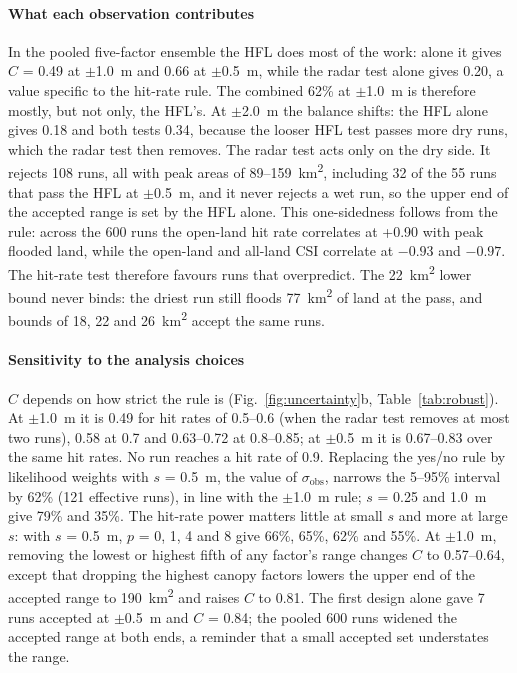 \documentclass[preprint,12pt,authoryear]{elsarticle}
\newcommand{\kmsq}{km\textsuperscript{2}}
\begin{document}
\paragraph{What each observation contributes} In the pooled five-factor ensemble the HFL does most of the work: alone it gives $C$ = 0.49 at $\pm$1.0~m and 0.66 at $\pm$0.5~m, while the radar test alone gives 0.20, a value specific to the hit-rate rule. The combined 62\% at $\pm$1.0~m is therefore mostly, but not only, the HFL's. At $\pm$2.0~m the balance shifts: the HFL alone gives 0.18 and both tests 0.34, because the looser HFL test passes more dry runs, which the radar test then removes. The radar test acts only on the dry side. It rejects 108 runs, all with peak areas of 89--159~\kmsq, including 32 of the 55 runs that pass the HFL at $\pm$0.5~m, and it never rejects a wet run, so the upper end of the accepted range is set by the HFL alone. This one-sidedness follows from the rule: across the 600 runs the open-land hit rate correlates at +0.90 with peak flooded land, while the open-land and all-land CSI correlate at $-0.93$ and $-0.97$. The hit-rate test therefore favours runs that overpredict. The 22~\kmsq{} lower bound never binds: the driest run still floods 77~\kmsq{} of land at the pass, and bounds of 18, 22 and 26~\kmsq{} accept the same runs.

\paragraph{Sensitivity to the analysis choices} $C$ depends on how strict the rule is (Fig.~\ref{fig:uncertainty}b, Table~\ref{tab:robust}). At $\pm$1.0~m it is 0.49 for hit rates of 0.5--0.6 (when the radar test removes at most two runs), 0.58 at 0.7 and 0.63--0.72 at 0.8--0.85; at $\pm$0.5~m it is 0.67--0.83 over the same hit rates. No run reaches a hit rate of 0.9. Replacing the yes/no rule by likelihood weights with $s$ = 0.5~m, the value of $\sigma_\mathrm{obs}$, narrows the 5--95\% interval by 62\% (121 effective runs), in line with the $\pm$1.0~m rule; $s$ = 0.25 and 1.0~m give 79\% and 35\%. The hit-rate power matters little at small $s$ and more at large $s$: with $s$ = 0.5~m, $p$ = 0, 1, 4 and 8 give 66\%, 65\%, 62\% and 55\%. At $\pm$1.0~m, removing the lowest or highest fifth of any factor's range changes $C$ to 0.57--0.64, except that dropping the highest canopy factors lowers the upper end of the accepted range to 190~\kmsq{} and raises $C$ to 0.81. The first design alone gave 7 runs accepted at $\pm$0.5~m and $C$ = 0.84; the pooled 600 runs widened the accepted range at both ends, a reminder that a small accepted set understates the range.
\end{document}
